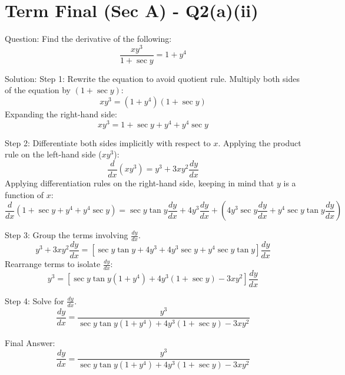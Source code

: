\documentclass{article}
\begin{document}
\section*{Term Final (Sec A) - Q2(a)(ii)}
Question:
Find the derivative of the following:
\[
\frac{xy^3}{1+\sec y} = 1 + y^4
\]

Solution:
Step 1: Rewrite the equation to avoid quotient rule.
Multiply both sides of the equation by $(1 + \sec y)$:
\[
xy^3 = (1 + y^4)(1 + \sec y)
\]
Expanding the right-hand side:
\[
xy^3 = 1 + \sec y + y^4 + y^4 \sec y
\]

Step 2: Differentiate both sides implicitly with respect to $x$.
Applying the product rule on the left-hand side ($xy^3$):
\[
\frac{d}{dx}(xy^3) = y^3 + 3xy^2 \frac{dy}{dx}
\]
Applying differentiation rules on the right-hand side, keeping in mind that $y$ is a function of $x$:
\[
\frac{d}{dx}(1 + \sec y + y^4 + y^4 \sec y) = \sec y \tan y \frac{dy}{dx} + 4y^3 \frac{dy}{dx} + \left(4y^3 \sec y \frac{dy}{dx} + y^4 \sec y \tan y \frac{dy}{dx}\right)
\]

Step 3: Group the terms involving $\frac{dy}{dx}$.
\[
y^3 + 3xy^2 \frac{dy}{dx} = \left[ \sec y \tan y + 4y^3 + 4y^3 \sec y + y^4 \sec y \tan y \right] \frac{dy}{dx}
\]
Rearrange terms to isolate $\frac{dy}{dx}$:
\[
y^3 = \left[ \sec y \tan y (1 + y^4) + 4y^3 (1 + \sec y) - 3xy^2 \right] \frac{dy}{dx}
\]

Step 4: Solve for $\frac{dy}{dx}$.
\[
\frac{dy}{dx} = \frac{y^3}{\sec y \tan y (1 + y^4) + 4y^3 (1 + \sec y) - 3xy^2}
\]

Final Answer:
\[
\boxed{\frac{dy}{dx} = \frac{y^3}{\sec y \tan y (1 + y^4) + 4y^3 (1 + \sec y) - 3xy^2}}
\]

\end{document}
